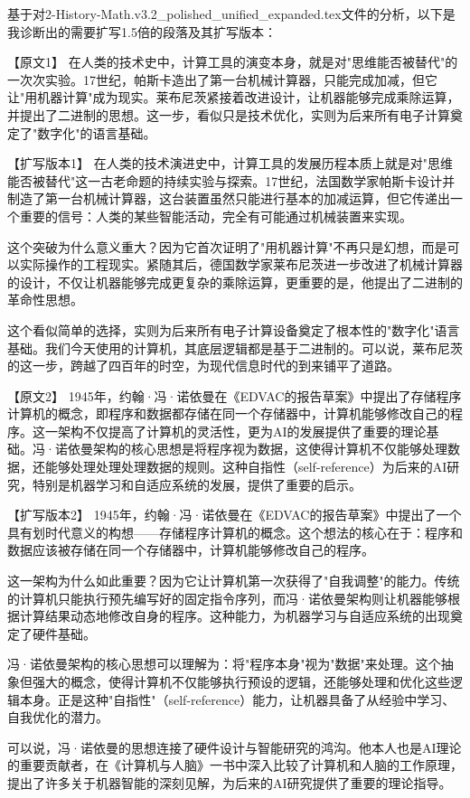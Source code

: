 基于对2-History-Math.v3.2_polished_unified_expanded.tex文件的分析，以下是我诊断出的需要扩写1.5倍的段落及其扩写版本：

【原文1】
在人类的技术史中，计算工具的演变本身，就是对"思维能否被替代"的一次次实验。17世纪，帕斯卡造出了第一台机械计算器，只能完成加减，但它让"用机器计算"成为现实。莱布尼茨紧接着改进设计，让机器能够完成乘除运算，并提出了二进制的思想。这一步，看似只是技术优化，实则为后来所有电子计算奠定了"数字化"的语言基础。

【扩写版本1】
在人类的技术演进史中，计算工具的发展历程本质上就是对"思维能否被替代"这一古老命题的持续实验与探索。17世纪，法国数学家帕斯卡设计并制造了第一台机械计算器，这台装置虽然只能进行基本的加减运算，但它传递出一个重要的信号：人类的某些智能活动，完全有可能通过机械装置来实现。

这个突破为什么意义重大？因为它首次证明了"用机器计算"不再只是幻想，而是可以实际操作的工程现实。紧随其后，德国数学家莱布尼茨进一步改进了机械计算器的设计，不仅让机器能够完成更复杂的乘除运算，更重要的是，他提出了二进制的革命性思想。

这个看似简单的选择，实则为后来所有电子计算设备奠定了根本性的"数字化"语言基础。我们今天使用的计算机，其底层逻辑都是基于二进制的。可以说，莱布尼茨的这一步，跨越了四百年的时空，为现代信息时代的到来铺平了道路。

【原文2】
1945年，约翰·冯·诺依曼在《EDVAC的报告草案》中提出了存储程序计算机的概念，即程序和数据都存储在同一个存储器中，计算机能够修改自己的程序。这一架构不仅提高了计算机的灵活性，更为AI的发展提供了重要的理论基础。冯·诺依曼架构的核心思想是将程序视为数据，这使得计算机不仅能够处理数据，还能够处理处理处理数据的规则。这种自指性（self-reference）为后来的AI研究，特别是机器学习和自适应系统的发展，提供了重要的启示。

【扩写版本2】
1945年，约翰·冯·诺依曼在《EDVAC的报告草案》中提出了一个具有划时代意义的构想——存储程序计算机的概念。这个想法的核心在于：程序和数据应该被存储在同一个存储器中，计算机能够修改自己的程序。

这一架构为什么如此重要？因为它让计算机第一次获得了"自我调整"的能力。传统的计算机只能执行预先编写好的固定指令序列，而冯·诺依曼架构则让机器能够根据计算结果动态地修改自身的程序。这种能力，为机器学习与自适应系统的出现奠定了硬件基础。

冯·诺依曼架构的核心思想可以理解为：将"程序本身"视为"数据"来处理。这个抽象但强大的概念，使得计算机不仅能够执行预设的逻辑，还能够处理和优化这些逻辑本身。正是这种"自指性"（self-reference）能力，让机器具备了从经验中学习、自我优化的潜力。

可以说，冯·诺依曼的思想连接了硬件设计与智能研究的鸿沟。他本人也是AI理论的重要贡献者，在《计算机与人脑》一书中深入比较了计算机和人脑的工作原理，提出了许多关于机器智能的深刻见解，为后来的AI研究提供了重要的理论指导。

